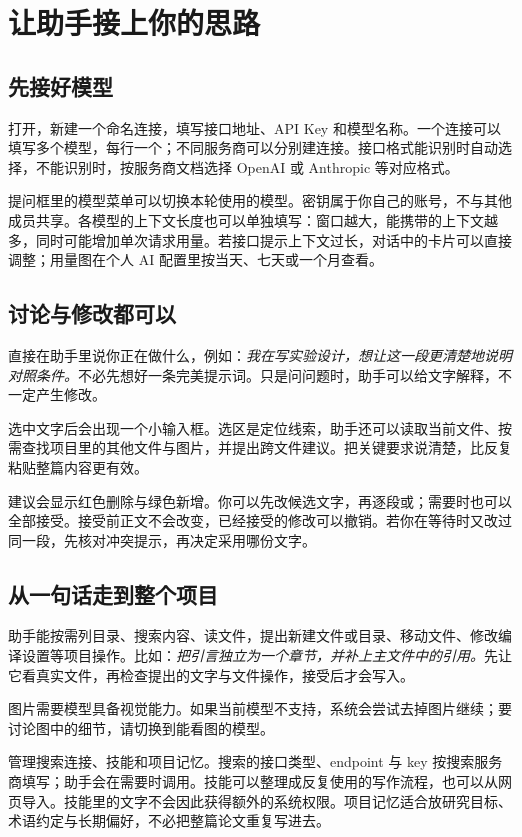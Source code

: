 \section{让助手接上你的思路}
\subsection{先接好模型}
打开，新建一个命名连接，填写接口地址、API Key 和模型名称。一个连接可以填写多个模型，每行一个；不同服务商可以分别建连接。接口格式能识别时自动选择，不能识别时，按服务商文档选择 OpenAI 或 Anthropic 等对应格式。

提问框里的模型菜单可以切换本轮使用的模型。密钥属于你自己的账号，不与其他成员共享。各模型的上下文长度也可以单独填写：窗口越大，能携带的上下文越多，同时可能增加单次请求用量。若接口提示上下文过长，对话中的卡片可以直接调整；用量图在个人 AI 配置里按当天、七天或一个月查看。

\subsection{讨论与修改都可以}
直接在助手里说你正在做什么，例如：\emph{我在写实验设计，想让这一段更清楚地说明对照条件。}不必先想好一条完美提示词。只是问问题时，助手可以给文字解释，不一定产生修改。

选中文字后会出现一个小输入框。选区是定位线索，助手还可以读取当前文件、按需查找项目里的其他文件与图片，并提出跨文件建议。把关键要求说清楚，比反复粘贴整篇内容更有效。


建议会显示红色删除与绿色新增。你可以先改候选文字，再逐段或；需要时也可以全部接受。接受前正文不会改变，已经接受的修改可以撤销。若你在等待时又改过同一段，先核对冲突提示，再决定采用哪份文字。

\subsection{从一句话走到整个项目}
助手能按需列目录、搜索内容、读文件，提出新建文件或目录、移动文件、修改编译设置等项目操作。比如：\emph{把引言独立为一个章节，并补上主文件中的引用。}先让它看真实文件，再检查提出的文字与文件操作，接受后才会写入。

图片需要模型具备视觉能力。如果当前模型不支持，系统会尝试去掉图片继续；要讨论图中的细节，请切换到能看图的模型。

管理搜索连接、技能和项目记忆。搜索的接口类型、endpoint 与 key 按搜索服务商填写；助手会在需要时调用。技能可以整理成反复使用的写作流程，也可以从网页导入。技能里的文字不会因此获得额外的系统权限。项目记忆适合放研究目标、术语约定与长期偏好，不必把整篇论文重复写进去。

